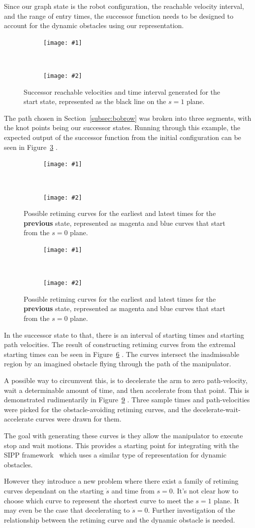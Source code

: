 \documentclass[letterpaper,10pt]{article} %
\newcommand{\ffigdoublevert}[4]{
\begin{figure}[h!]
\centering

\begin{subfigure}[t!]{0.8\linewidth}
\texttt{[image: \#1]}
\caption{}
\label{fig:#4L}
\end{subfigure}
~
\begin{subfigure}[b!]{0.8\linewidth}
\texttt{[image: \#2]}
\caption{}
\label{fig:#4R}
\end{subfigure}

\caption{#3}
\label{fig:#4}
\end{figure}
}
\newcommand{\reffig}[1]
{
Figure~\ref{fig:#1}
}
\begin{document}
Since our graph state is the robot configuration, the reachable velocity interval, and the range of entry times, the successor function needs to be designed to account for the dynamic obstacles using our representation.

\ffigdoublevert{pics/planner/initial_exp1}{pics/planner/initial_exp2}{Successor reachable velocities and time interval generated for the start state, represented as the black line on the $s=1$ plane.}{iexp}

The path chosen in Section~\ref{subsec:bobrow} was broken into three segments, with the knot points being our successor states. Running through this example, the expected output of the successor function from the initial configuration can be seen in \reffig{iexp}.

\ffigdoublevert{pics/planner/second_exp1}{pics/planner/second_exp2}{Possible retiming curves for the earliest and latest times for the \textbf{previous} state, represented as magenta and blue curves that start from the $s=0$ plane.}{sexpA}

\ffigdoublevert{pics/planner/second_exp4}{pics/planner/second_exp5}{Possible retiming curves for the earliest and latest times for the \textbf{previous} state, represented as magenta and blue curves that start from the $s=0$ plane.}{sexpB}

In the successor state to that, there is an interval of starting times and starting path velocities. The result of constructing retiming curves from the extremal starting times can be seen in \reffig{sexpA}. The curves intersect the inadmissable region by an imagined obstacle flying through the path of the manipulator.

A possible way to circumvent this, is to decelerate the arm to zero path-velocity, wait a determinable amount of time, and then accelerate from that point. This is demonstrated rudimentarily in\reffig{sexpB}. Three sample times and path-velocities were picked for the obstacle-avoiding retiming curves, and the decelerate-wait-accelerate curves were drawn for them.

The goal with generating these curves is they allow the manipulator to execute stop and wait motions. This provides a starting point for integrating with the SIPP framework~\cite{phillips2011sipp} which uses a similar type of representation for dynamic obstacles.

However they introduce a new problem where there exist a family of retiming curves dependant on the starting $\dot{s}$ and time from $s=0$. It's not clear how to choose which curve to represent the shortest curve to meet the $s=1$ plane. It may even be the case that decelerating to $\dot{s}=0$. Further investigation of the relationship between the retiming curve and the dynamic obstacle is needed.
\end{document}
